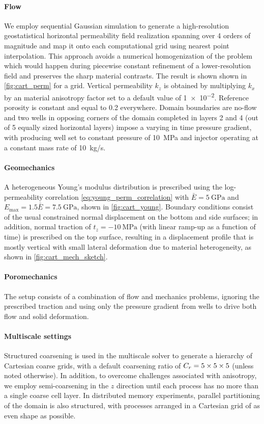 \paragraph{Flow}
We employ sequential Gaussian simulation to generate a high-resolution geostatistical horizontal permeability field realization spanning over 4 orders of magnitude and map it onto each computational grid using nearest point interpolation.   This approach avoids a numerical homogenization of the problem which would happen during piecewise constant refinement of a lower-resolution field and preserves the sharp material contrasts.   The result is shown shown in \cref{fig:cart_perm} for a  grid.   Vertical permeability $k_z$ is obtained by multiplying $k_x$ by an material anisotropy factor set to a default value of \num{1e-2}.   Reference porosity is constant and equal to 0.2 everywhere.   Domain boundaries are no-flow and two wells in opposing corners of the domain completed in layers 2 and 4 (out of 5 equally sized horizontal layers)  impose a varying in time pressure gradient, with producing well set to constant pressure of \qty{10}{\MPa} and injector operating at a constant mass rate of \qty{10}{kg/s}.

\paragraph{Geomechanics}
A heterogeneous Young's modulus distribution is prescribed using the log-permeability correlation \cref{eq:young_perm_correlation} with $\bar{E} = \qty{5}{\GPa}$ and $E_{\max} = 1.5 \bar{E} = \qty{7.5}{\GPa}$, shown in \cref{fig:cart_young}.   Boundary conditions consist of the usual constrained normal displacement on the bottom and side surfaces; in addition, normal traction of $t_z = -\qty{10}{\MPa}$ (with linear ramp-up as a function of time) is prescribed on the top surface, resulting in a displacement profile that is mostly vertical with small lateral deformation due to material heterogeneity, as shown in \cref{fig:cart_mech_sketch}.

\paragraph{Poromechanics}
The setup consists of a combination of flow and mechanics problems, ignoring the prescribed traction and using only the pressure gradient from wells to drive both flow and solid deformation.

\paragraph{Multiscale settings}
Structured coarsening is used in the multiscale solver to generate a hierarchy of Cartesian coarse grids, with a default coarsening ratio of $C_r = \numproduct{5x5x5}$ (unless noted otherwise).   In addition, to overcome challenges associated with anisotropy, we employ semi-coarsening in the $z$ direction until each process has no more than a single coarse cell layer.   In distributed memory experiments, parallel partitioning of the domain is also structured, with processes arranged in a Cartesian grid of as even shape as possible.

